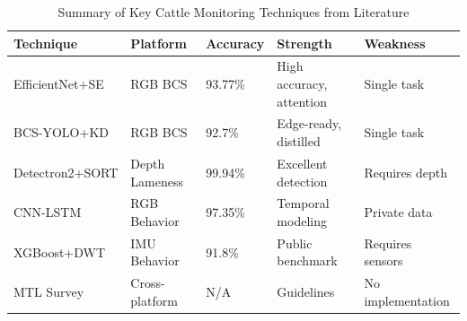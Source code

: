 \begin{table}[h]
\centering
\caption{Summary of Key Cattle Monitoring Techniques from Literature}
\label{tab:summary}
\begin{tabular}{|p{3.2cm}|p{2cm}|p{1.8cm}|p{3.2cm}|p{2.8cm}|}
\hline
\textbf{Technique} & \textbf{Platform} & \textbf{Accuracy} & \textbf{Strength} & \textbf{Weakness} \\
\hline
EfficientNet+SE & RGB BCS & 93.77\% & High accuracy, attention & Single task \\
\hline
BCS-YOLO+KD & RGB BCS & 92.7\% & Edge-ready, distilled & Single task \\
\hline
Detectron2+SORT & Depth Lameness & 99.94\% & Excellent detection & Requires depth \\
\hline
CNN-LSTM & RGB Behavior & 97.35\% & Temporal modeling & Private data \\
\hline
XGBoost+DWT & IMU Behavior & 91.8\% & Public benchmark & Requires sensors \\
\hline
MTL Survey & Cross-platform & N/A & Guidelines & No implementation \\
\hline
\end{tabular}
\end{table}
